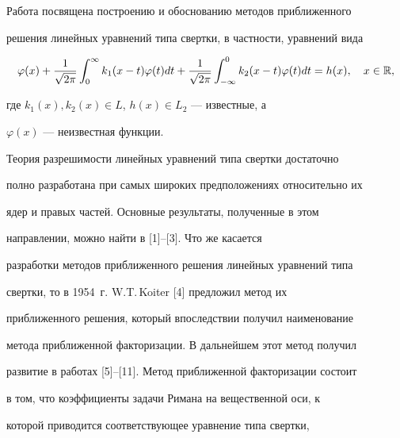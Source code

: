 

\maketitle


\label{begin}











Работа посвящена построению и обоснованию методов приближенного


решения линейных уравнений типа свертки, в частности, уравнений вида


\begin{equation}


\label{l1} \varphi(x)+\frac{1}{\sqrt{2\pi}}\int_0^\infty


k_1(x-t)\varphi(t)dt+\frac{1}{\sqrt{2\pi}}\int_{-\infty}^0


k_2(x-t)\varphi(t)dt=h(x), \quad x \in \Bbb R,


\end{equation}


где $k_1(x), k_2(x) \in L$, $h(x) \in L_2$ --- известные, а


$\varphi(x)$ --- неизвестная функции.





Теория разрешимости линейных уравнений типа свертки достаточно


полно разработана при самых широких предположениях относительно их


ядер и правых частей. Основные результаты, полученные в этом


направлении, можно найти в [1]--[3]. Что же касается


разработки методов приближенного решения линейных уравнений типа


свертки, то в 1954~г. W.T.\,Koiter [4] предложил метод их


приближенного решения, который впоследствии получил наименование


метода приближенной факторизации.  В дальнейшем этот метод получил


развитие в работах [5]--[11]. Метод приближенной факторизации состоит


в том, что коэффициенты задачи Римана на вещественной оси, к


которой приводится соответствующее уравнение типа свертки,


